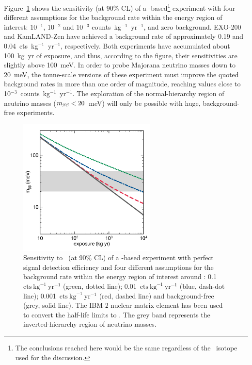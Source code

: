 \documentclass{PoS}
\begin{document}
Figure~\ref{fig:SensitivityXeVsBackground} shows the sensitivity (at 90\% CL) of a \XE-based\footnote{The conclusions reached here would be the same regardless of the \bb\ isotope used for the discussion.} experiment with four different assumptions for the background rate within the energy region of interest: 10$^{-1}$, 10$^{-2}$ and 10$^{-3}$ counts~kg$^{-1}$~yr$^{-1}$, and zero background. EXO-200 and KamLAND-Zen have achieved a background rate of approximately 0.19 and 0.04~cts~kg$^{-1}$~yr$^{-1}$, respectively. Both experiments have accumulated about 100~kg~yr of exposure, and thus, according to the figure, their sensitivities are slightly above 100~meV. In order to probe Majorana neutrino masses down to 20~meV, the tonne-scale versions of these experiment must improve the quoted background rates in more than one order of magnitude, reaching values close to 10$^{-3}$~counts~kg$^{-1}$~yr$^{-1}$. The exploration of the normal-hierarchy region of neutrino masses ($m_{\beta\beta}<20$~meV) will only be possible with huge, background-free experiments.


\begin{figure}
\centering
\includegraphics[width=0.615\textwidth]{img/SensitivityXeVsBackground.pdf}
\caption{Sensitivity to \mbb\ (at 90\% CL) of a \XE-based experiment with perfect signal detection efficiency and four different assumptions for the background rate within the energy region of interest around \Qbb: 0.1~$\mathrm{cts}~\mathrm{kg}^{-1}~\mathrm{yr}^{-1}$ (green, dotted line); 0.01~$\mathrm{cts}~\mathrm{kg}^{-1}~\mathrm{yr}^{-1}$ (blue, dash-dot line); 0.001~$\mathrm{cts}~\mathrm{kg}^{-1}~\mathrm{yr}^{-1}$ (red, dashed line) and background-free (grey, solid line). The IBM-2 nuclear matrix element has been used to convert the half-life limits to \mbb. The grey band represents the inverted-hierarchy region of neutrino masses.} \label{fig:SensitivityXeVsBackground}
\end{figure}
\end{document}
